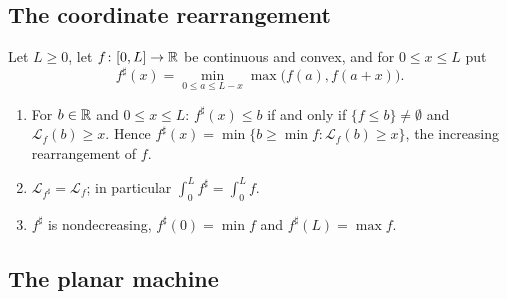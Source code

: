 \subsection{The coordinate rearrangement}

\begin{lemma}\label{I:lem:fcp-interval}
Let $L\ge0$, let $f\colon[0,L]\to\mathbb{R}$ be continuous and convex, and for $0\le x\le L$ put
\[
 f^\sharp(x)=\min_{0\le a\le L-x}\max\bigl(f(a),f(a+x)\bigr).
\]
\begin{enumerate}[label=(\alph*)]
\item For $b\in\mathbb{R}$ and $0\le x\le L$: $f^\sharp(x)\le b$ if and only if $\{f\le b\}\ne\emptyset$ and
 $\mathcal L_f(b)\ge x$. Hence $f^\sharp(x)=\min\{b\ge\min f:\mathcal L_f(b)\ge x\}$, the increasing rearrangement of
 $f$.
\item $\mathcal L_{f^\sharp}=\mathcal L_f$; in particular $\int_0^Lf^\sharp=\int_0^Lf$.
\item $f^\sharp$ is nondecreasing, $f^\sharp(0)=\min f$ and $f^\sharp(L)=\max f$.
\end{enumerate}
\end{lemma}

\subsection{The planar machine}

